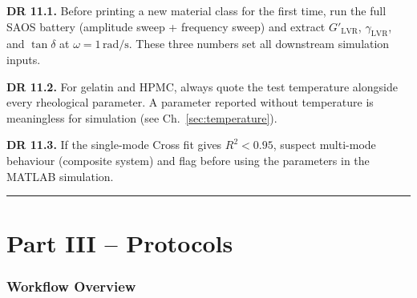 \documentclass[11pt,a4paper]{article}
\begin{document}
\begin{designrulebox}
\textbf{DR 11.1.} Before printing a new material class for the first
time, run the full SAOS battery (amplitude sweep + frequency sweep) and
extract $G'_\mathrm{LVR}$, $\gamma_\mathrm{LVR}$, and $\tan\delta$ at
$\omega=1\,\si{\radian\per\s}$.  These three numbers set all downstream
simulation inputs.

\textbf{DR 11.2.} For gelatin and HPMC, always quote the test
temperature alongside every rheological parameter.  A parameter reported
without temperature is meaningless for simulation (see Ch.~\ref{sec:temperature}).

\textbf{DR 11.3.} If the single-mode Cross fit gives $R^2<0.95$, suspect
multi-mode behaviour (composite system) and flag before using the
parameters in the MATLAB simulation.
\end{designrulebox}

\bigskip\hrule\bigskip

\part*{Part III -- Protocols}

\section{Workflow Overview}
\label{sec:protocols}
\end{document}
